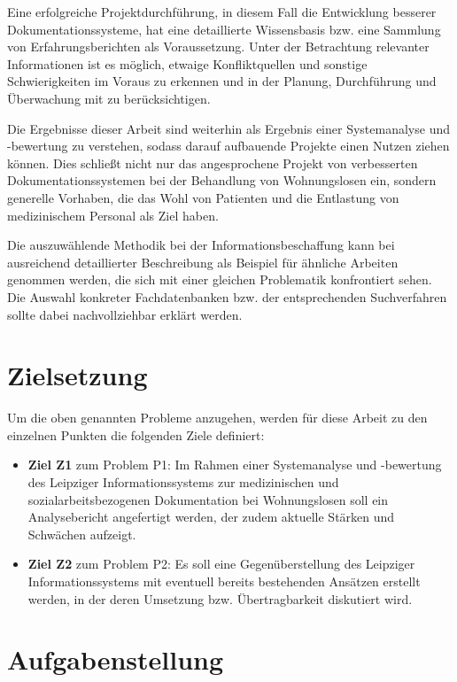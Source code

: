 Eine erfolgreiche Projektdurchführung, in diesem Fall die Entwicklung besserer Dokumentationssysteme, hat eine detaillierte Wissensbasis bzw. eine Sammlung von Erfahrungsberichten als Voraussetzung. Unter der Betrachtung relevanter Informationen ist es möglich, etwaige Konfliktquellen und sonstige Schwierigkeiten im Voraus zu erkennen und in der Planung, Durchführung und Überwachung mit zu berücksichtigen.

Die Ergebnisse dieser Arbeit sind weiterhin als Ergebnis einer Systemanalyse und -bewertung zu verstehen, sodass darauf aufbauende Projekte einen Nutzen ziehen können. Dies schließt nicht nur das angesprochene Projekt von verbesserten Dokumentationssystemen bei der Behandlung von Wohnungslosen ein, sondern generelle Vorhaben, die das Wohl von Patienten und die Entlastung von medizinischem Personal als Ziel haben.

Die auszuwählende Methodik bei der Informationsbeschaffung kann bei ausreichend detaillierter Beschreibung als Beispiel für ähnliche Arbeiten genommen werden, die sich mit einer gleichen Problematik konfrontiert sehen. Die Auswahl konkreter Fachdatenbanken bzw. der entsprechenden Suchverfahren sollte dabei nachvollziehbar erklärt werden.

\newpage

\section{Zielsetzung}\label{sec:zielsetzung}

Um die oben genannten Probleme anzugehen, werden für diese Arbeit zu den einzelnen Punkten die folgenden Ziele definiert:

\begin{itemize}
	\item \textbf{Ziel Z1} zum Problem P1: Im Rahmen einer Systemanalyse und -bewertung des Leipziger Informationssystems zur medizinischen und sozialarbeitsbezogenen Dokumentation bei Wohnungslosen soll ein Analysebericht angefertigt werden, der zudem aktuelle Stärken und Schwächen aufzeigt.
	\item \textbf{Ziel Z2} zum Problem P2: Es soll eine Gegenüberstellung des Leipziger Informationssystems mit eventuell bereits bestehenden Ansätzen erstellt werden, in der deren Umsetzung bzw. Übertragbarkeit diskutiert wird.
\end{itemize}


\section{Aufgabenstellung}

